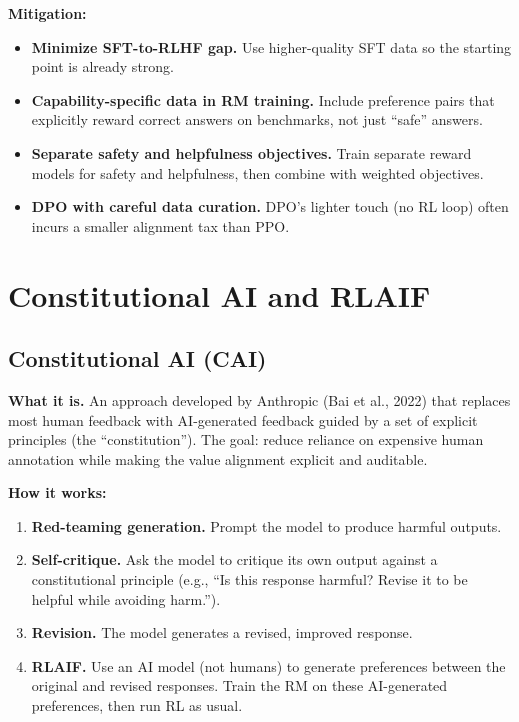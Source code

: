 \textbf{Mitigation:}
\begin{itemize}
    \item \textbf{Minimize SFT-to-RLHF gap.} Use higher-quality SFT data so the starting point is already strong.
    \item \textbf{Capability-specific data in RM training.} Include preference pairs that explicitly reward correct answers on benchmarks, not just ``safe'' answers.
    \item \textbf{Separate safety and helpfulness objectives.} Train separate reward models for safety and helpfulness, then combine with weighted objectives.
    \item \textbf{DPO with careful data curation.} DPO's lighter touch (no RL loop) often incurs a smaller alignment tax than PPO.
\end{itemize}

\section{Constitutional AI and RLAIF}
\label{sec:constitutional_ai}

\subsection{Constitutional AI (CAI)}

\textbf{What it is.} An approach developed by Anthropic (Bai et al., 2022) that replaces most human feedback with AI-generated feedback guided by a set of explicit principles (the ``constitution''). The goal: reduce reliance on expensive human annotation while making the value alignment explicit and auditable.

\textbf{How it works:}
\begin{enumerate}
    \item \textbf{Red-teaming generation.} Prompt the model to produce harmful outputs.
    \item \textbf{Self-critique.} Ask the model to critique its own output against a constitutional principle (e.g., ``Is this response harmful? Revise it to be helpful while avoiding harm.'').
    \item \textbf{Revision.} The model generates a revised, improved response.
    \item \textbf{RLAIF.} Use an AI model (not humans) to generate preferences between the original and revised responses. Train the RM on these AI-generated preferences, then run RL as usual.
\end{enumerate}

